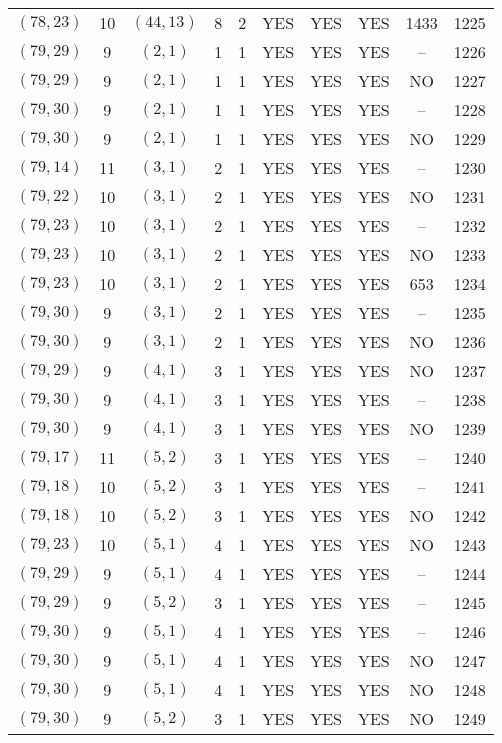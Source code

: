 \begin{longtable}{|c|c|c|c|c|c|c|c|c|c|}
$(78, 23)$ & 10 & $(44, 13)$ & 8 & 2 & YES & YES & YES & 1433 & 1225\\
$(79, 29)$ & 9 & $(2, 1)$ & 1 & 1 & YES & YES & YES & -- & 1226\\
$(79, 29)$ & 9 & $(2, 1)$ & 1 & 1 & YES & YES & YES & NO & 1227\\
$(79, 30)$ & 9 & $(2, 1)$ & 1 & 1 & YES & YES & YES & -- & 1228\\
$(79, 30)$ & 9 & $(2, 1)$ & 1 & 1 & YES & YES & YES & NO & 1229\\
$(79, 14)$ & 11 & $(3, 1)$ & 2 & 1 & YES & YES & YES & -- & 1230\\
$(79, 22)$ & 10 & $(3, 1)$ & 2 & 1 & YES & YES & YES & NO & 1231\\
$(79, 23)$ & 10 & $(3, 1)$ & 2 & 1 & YES & YES & YES & -- & 1232\\
$(79, 23)$ & 10 & $(3, 1)$ & 2 & 1 & YES & YES & YES & NO & 1233\\
$(79, 23)$ & 10 & $(3, 1)$ & 2 & 1 & YES & YES & YES & 653 & 1234\\
$(79, 30)$ & 9 & $(3, 1)$ & 2 & 1 & YES & YES & YES & -- & 1235\\
$(79, 30)$ & 9 & $(3, 1)$ & 2 & 1 & YES & YES & YES & NO & 1236\\
$(79, 29)$ & 9 & $(4, 1)$ & 3 & 1 & YES & YES & YES & NO & 1237\\
$(79, 30)$ & 9 & $(4, 1)$ & 3 & 1 & YES & YES & YES & -- & 1238\\
$(79, 30)$ & 9 & $(4, 1)$ & 3 & 1 & YES & YES & YES & NO & 1239\\
$(79, 17)$ & 11 & $(5, 2)$ & 3 & 1 & YES & YES & YES & -- & 1240\\
$(79, 18)$ & 10 & $(5, 2)$ & 3 & 1 & YES & YES & YES & -- & 1241\\
$(79, 18)$ & 10 & $(5, 2)$ & 3 & 1 & YES & YES & YES & NO & 1242\\
$(79, 23)$ & 10 & $(5, 1)$ & 4 & 1 & YES & YES & YES & NO & 1243\\
$(79, 29)$ & 9 & $(5, 1)$ & 4 & 1 & YES & YES & YES & -- & 1244\\
$(79, 29)$ & 9 & $(5, 2)$ & 3 & 1 & YES & YES & YES & -- & 1245\\
$(79, 30)$ & 9 & $(5, 1)$ & 4 & 1 & YES & YES & YES & -- & 1246\\
$(79, 30)$ & 9 & $(5, 1)$ & 4 & 1 & YES & YES & YES & NO & 1247\\
$(79, 30)$ & 9 & $(5, 1)$ & 4 & 1 & YES & YES & YES & NO & 1248\\
$(79, 30)$ & 9 & $(5, 2)$ & 3 & 1 & YES & YES & YES & NO & 1249\\

\end{longtable}
